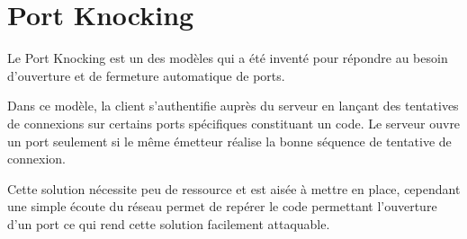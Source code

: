 \chapter{Port Knocking}

Le Port Knocking est un des modèles qui a été inventé pour répondre au besoin d'ouverture et de fermeture automatique de ports.

Dans ce modèle, la client s'authentifie auprès du serveur en lançant des tentatives de connexions sur certains ports spécifiques constituant un code. Le serveur ouvre un port seulement si le même émetteur réalise la bonne séquence de tentative de connexion.

Cette solution nécessite peu de ressource et est aisée à mettre en place, cependant une simple écoute du réseau permet de repérer le code permettant l'ouverture d'un port ce qui rend cette solution facilement attaquable.
